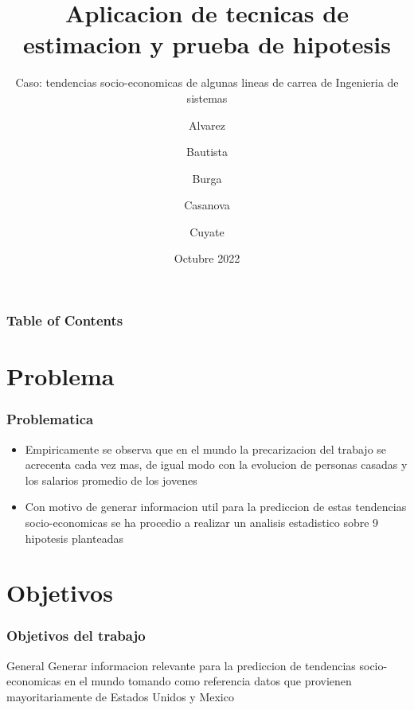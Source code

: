 \documentclass{beamer}
\title[PC1 Estadistica Aplicada] %
{Aplicacion de tecnicas de estimacion y prueba de hipotesis}
\subtitle{
  Caso: tendencias socio-economicas de algunas
  lineas de carrea de Ingenieria de sistemas
}
\author %
{
  Alvarez \and Bautista \and Burga \and
  Casanova \and  Cuyate
}
\institute
{
  Facultad de Ingenieria Industrial y de Sistemas\\
  \textbf{Universidad Nacional de Ingenieria}
}
\date
{Octubre 2022}
\begin{document}
\frame{\titlepage}


\begin{frame}
\frametitle{Table of Contents}
\tableofcontents
\end{frame}

\section{Problema}

\begin{frame}
\frametitle{Problematica}

\begin{itemize}
    \item Empiricamente se observa que en el mundo la precarizacion del trabajo
se acrecenta cada vez mas, de igual modo con la evolucion
    de personas casadas y los salarios promedio de los jovenes
    \item Con motivo de generar informacion util para la prediccion de estas tendencias
socio-economicas se ha procedio a realizar un analisis estadistico sobre
9 hipotesis planteadas

\end{itemize}
\end{frame}



\section{Objetivos}

\begin{frame}

\frametitle{Objetivos del trabajo}

\begin{alertblock}{General}
  Generar informacion relevante para la prediccion de tendencias
  socio-economicas en el mundo tomando como referencia datos
  que provienen mayoritariamente de Estados Unidos y Mexico
\end{alertblock}
\end{frame}
\end{document}
